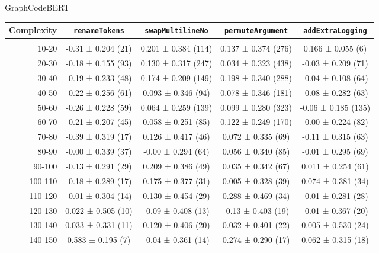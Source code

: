 \documentclass[sigconf,review,anonymous]{acmart}
\begin{document}
{    GraphCodeBERT
    \begin{table}[H]
      \tiny
      \begin{tabular}{r|cccc}
        Complexity          & \lstinline|renameTokens|        & \lstinline|swapMultilineNo|     & \lstinline|permuteArgument|     & \lstinline|addExtraLogging|     \\\hline\\
        10-20               & -0.31 ± 0.204 (21)  & 0.201 ± 0.384 (114) & 0.137 ± 0.374 (276) & 0.166 ± 0.055 (6)   \\
        20-30               & -0.18 ± 0.155 (93)  & 0.130 ± 0.317 (247) & 0.034 ± 0.323 (438) & -0.03 ± 0.209 (71)  \\
        30-40               & -0.19 ± 0.233 (48)  & 0.174 ± 0.209 (149) & 0.198 ± 0.340 (288) & -0.04 ± 0.108 (64)  \\
        40-50               & -0.22 ± 0.256 (61)  & 0.093 ± 0.346 (94)  & 0.078 ± 0.346 (181) & -0.08 ± 0.282 (63)  \\
        50-60               & -0.26 ± 0.228 (59)  & 0.064 ± 0.259 (139) & 0.099 ± 0.280 (323) & -0.06 ± 0.185 (135) \\
        60-70               & -0.21 ± 0.207 (45)  & 0.058 ± 0.251 (85)  & 0.122 ± 0.249 (170) & -0.00 ± 0.224 (82)  \\
        70-80               & -0.39 ± 0.319 (17)  & 0.126 ± 0.417 (46)  & 0.072 ± 0.335 (69)  & -0.11 ± 0.315 (63)  \\
        80-90               & -0.00 ± 0.339 (37)  & -0.00 ± 0.294 (64)  & 0.056 ± 0.340 (85)  & -0.01 ± 0.295 (69)  \\
        90-100              & -0.13 ± 0.291 (29)  & 0.209 ± 0.386 (49)  & 0.035 ± 0.342 (67)  & 0.011 ± 0.254 (61)  \\
        100-110             & -0.18 ± 0.289 (17)  & 0.175 ± 0.377 (31)  & 0.005 ± 0.328 (39)  & 0.074 ± 0.381 (34)  \\
        110-120             & -0.01 ± 0.304 (14)  & 0.130 ± 0.454 (29)  & 0.288 ± 0.469 (34)  & -0.01 ± 0.281 (28)  \\
        120-130             & 0.022 ± 0.505 (10)  & -0.09 ± 0.408 (13)  & -0.13 ± 0.403 (19)  & -0.01 ± 0.367 (20)  \\
        130-140             & 0.033 ± 0.331 (11)  & 0.120 ± 0.406 (20)  & 0.032 ± 0.401 (22)  & 0.005 ± 0.530 (24)  \\
        140-150             & 0.583 ± 0.195 (7)   & -0.04 ± 0.361 (14)  & 0.274 ± 0.290 (17)  & 0.062 ± 0.315 (18)  \\
      \end{tabular}
    \end{table}

}
\end{document}
